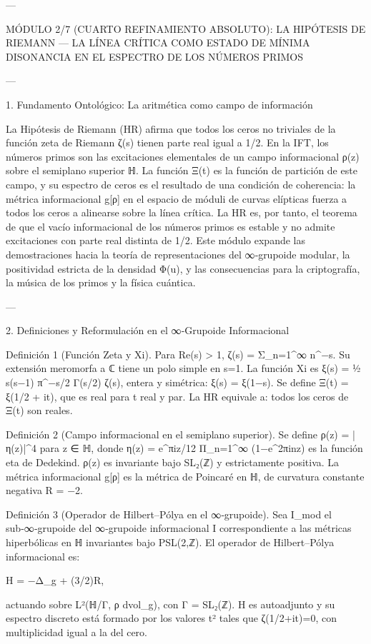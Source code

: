 \documentclass[12pt,twoside]{book}
\begin{document}
---

MÓDULO 2/7 (CUARTO REFINAMIENTO ABSOLUTO): LA HIPÓTESIS DE RIEMANN — LA LÍNEA CRÍTICA COMO ESTADO DE MÍNIMA DISONANCIA EN EL ESPECTRO DE LOS NÚMEROS PRIMOS

---

1. Fundamento Ontológico: La aritmética como campo de información

La Hipótesis de Riemann (HR) afirma que todos los ceros no triviales de la función zeta de Riemann ζ(s) tienen parte real igual a 1/2. En la IFT, los números primos son las excitaciones elementales de un campo informacional ρ(z) sobre el semiplano superior ℍ. La función Ξ(t) es la función de partición de este campo, y su espectro de ceros es el resultado de una condición de coherencia: la métrica informacional g[ρ] en el espacio de móduli de curvas elípticas fuerza a todos los ceros a alinearse sobre la línea crítica. La HR es, por tanto, el teorema de que el vacío informacional de los números primos es estable y no admite excitaciones con parte real distinta de 1/2. Este módulo expande las demostraciones hacia la teoría de representaciones del ∞‑grupoide modular, la positividad estricta de la densidad Φ(u), y las consecuencias para la criptografía, la música de los primos y la física cuántica.

---

2. Definiciones y Reformulación en el ∞‑Grupoide Informacional

Definición 1 (Función Zeta y Xi). Para Re(s) > 1, ζ(s) = Σ_{n=1}^∞ n^{−s}. Su extensión meromorfa a ℂ tiene un polo simple en s=1. La función Xi es ξ(s) = ½ s(s−1) π^{−s/2} Γ(s/2) ζ(s), entera y simétrica: ξ(s) = ξ(1−s). Se define Ξ(t) = ξ(1/2 + it), que es real para t real y par. La HR equivale a: todos los ceros de Ξ(t) son reales.

Definición 2 (Campo informacional en el semiplano superior). Se define ρ(z) = |η(z)|^4 para z ∈ ℍ, donde η(z) = e^{πiz/12} Π_{n=1}^∞ (1−e^{2πinz}) es la función eta de Dedekind. ρ(z) es invariante bajo SL₂(ℤ) y estrictamente positiva. La métrica informacional g[ρ] es la métrica de Poincaré en ℍ, de curvatura constante negativa R = −2.

Definición 3 (Operador de Hilbert–Pólya en el ∞‑grupoide). Sea I_{mod} el sub‑∞‑grupoide del ∞‑grupoide informacional I correspondiente a las métricas hiperbólicas en ℍ invariantes bajo PSL(2,ℤ). El operador de Hilbert–Pólya informacional es:

H = −Δ_g + (3/2)R,

actuando sobre L²(ℍ/Γ, ρ dvol_g), con Γ = SL₂(ℤ). H es autoadjunto y su espectro discreto está formado por los valores t² tales que ζ(1/2+it)=0, con multiplicidad igual a la del cero.
\end{document}

